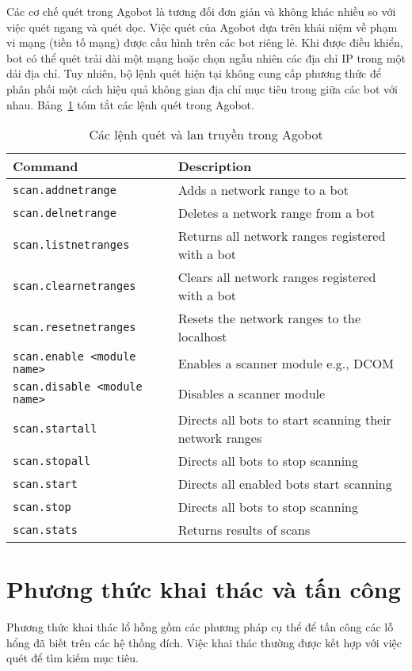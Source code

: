 Các cơ chế quét trong Agobot là tương đối đơn giản và không khác nhiều so với việc quét ngang và quét dọc.
Việc quét của Agobot dựa trên khái niệm về phạm vi mạng (tiền tố mạng) được cấu hình trên các bot riêng lẻ.
Khi được điều khiển, bot có thể quét trải dài một mạng hoặc chọn ngẫu nhiên các địa chỉ IP trong một dải địa chỉ.
Tuy nhiên, bộ lệnh quét hiện tại không cung cấp phương thức để phân phối một cách hiệu quả không gian địa chỉ mục tiêu trong giữa các bot với nhau. Bảng~\ref{table:botprog} tóm tắt các lệnh quét trong Agobot.

\begin{table}[ht!]
	\caption{Các lệnh quét và lan truyền trong Agobot}
	\label{table:botprog}
	\centering
	\footnotesize
	\begin{tabular}{l l}
		\toprule
		\textbf{Command} &
		\textbf{Description} \\
		\midrule
		\texttt{scan.addnetrange} & Adds a network range to a bot\\
		\texttt{scan.delnetrange} & Deletes a network range from a bot\\
		\texttt{scan.listnetranges} & Returns all network ranges registered with a bot\\
		\texttt{scan.clearnetranges} & Clears all network ranges registered with a bot\\
		\texttt{scan.resetnetranges} & Resets the network ranges to the localhost\\
		\texttt{scan.enable <module name>} & Enables a scanner module e.g., DCOM\\
		\texttt{scan.disable <module name>} & Disables a scanner module\\
		\texttt{scan.startall} & Directs all bots to start scanning their network ranges\\
		\texttt{scan.stopall} & Directs all bots to stop scanning\\
		\texttt{scan.start} & Directs all enabled bots start scanning\\
		\texttt{scan.stop} & Directs all bots to stop scanning\\
		\texttt{scan.stats} & Returns results of scans\\
		\bottomrule
	\end{tabular}
\end{table}

\section{Phương thức khai thác và tấn công}
Phương thức khai thác lổ hỗng gồm các phương pháp cụ thể để tấn công các lỗ hổng đã biết trên các hệ thống đích.
Việc khai thác thường được kết hợp với việc quét để tìm kiếm mục tiêu.

